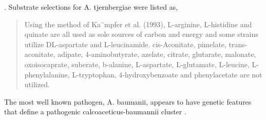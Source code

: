 \documentclass[aps,secnumarabic,balancelastpage,amsmath,amssymb,nofootinbib]{revtex4}
\begin{document}
{\cite{2011ME10179}. %
Substrate selections for A. tjernbergiae were listed as, 
\cite{Carr_Kampfer_Patel_Seven_novel_species_2003}
\begin{quote}
Using the method of Ka¨mpfer
et al. (1993), L-arginine, L-histidine and quinate are all used
as sole sources of carbon and energy and some strains utilize
DL-aspartate and L-leucinamide. cis-Aconitate, pimelate,
trans-aconitate, adipate, 4-aminobutyrate, azelate, citrate,
glutarate, malonate, oxoisocaprate, suberate, b-alanine,
L-aspartate, L-glutamate, L-leucine, L-phenylalanine,
L-tryptophan, 4-hydroxybenzoate and phenylacetate are not
utilized.
\end{quote}
The most well known pathogen, A. baumanii, appears to have 
genetic features that define a pathogenic 
 calcoaceticus-baumannii cluster
 \cite{10.1371/journal.pone.0090239}.
} %

\newcommand{\tjernbergiae} { %
} %
\end{document}
